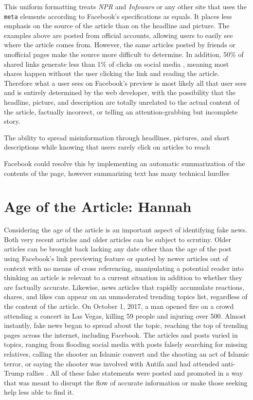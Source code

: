\documentclass[12pt]{article}
\begin{document}
This uniform formatting treats {\it NPR} and {\it Infowars} or any other site that uses the \texttt{meta} elements according to Facebook's specifications as equals. It places less emphasis on the source of the article than on the headline and picture. The examples above are posted from official accounts, allowing users to easily see where the article comes from. However, the same articles posted by friends or unofficial pages make the source more difficult to determine. In addition, 50\% of shared links generate less than 1\% of clicks on social media \citep{clicks_vs_shares}, meaning most shares happen without the user clicking the link and reading the article. Therefore what a user sees on Facebook's preview is most likely all that user sees and is entirely determined by the web developer, with the possibility that the headline, picture, and description are totally unrelated to the actual content of the article, factually incorrect, or telling an attention-grabbing but incomplete story. 

The ability to spread misinformation through headlines, pictures, and short descriptions while knowing that users rarely click on articles to reach 

Facebook could resolve this by implementing an automatic summarization of the contents of the page, however summarizing text has many technical hurdles

\section{Age of the Article: Hannah}

Considering the age of the article is an important aspect of identifying fake news. Both very recent articles and older articles can be subject to scrutiny. Older articles can be brought back lacking any date other than the age of the post using Facebook's link previewing feature or quoted by newer articles out of context with no means of cross referencing, manipulating a potential reader into thinking an article is relevant to a current situation in addition to whether they are factually accurate. Likewise, news articles that rapidly accumulate reactions, shares, and likes can appear on an unmoderated trending topics list, regardless of the content of the article. On October 1, 2017, a man opened fire on a crowd attending a concert in Las Vegas, killing 59 people and injuring over 500. Almost instantly, fake news began to spread about the topic, reaching the top of trending pages across the internet, including Facebook. The articles and posts varied in topics, ranging from flooding social media with posts falsely searching for missing relatives, calling the shooter an Islamic convert and the shooting an act of Islamic terror, or saying the shooter was involved with Antifa and had attended anti-Trump rallies \citep{buzzfeed_vegas_conspiracies}. All of these false statements were posted and promoted in a way that was meant to disrupt the flow of accurate information or make those seeking help less able to find it.
\end{document}
